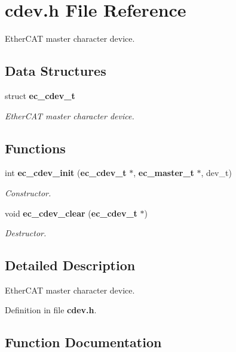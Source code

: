 \section{cdev.\-h File Reference}
\label{cdev_8h}


Ether\-C\-A\-T master character device.  


\subsection*{Data Structures}
\begin{DoxyCompactItemize}
\item 
struct {\bf ec\-\_\-cdev\-\_\-t}
\begin{DoxyCompactList}\small\item\em Ether\-C\-A\-T master character device. \end{DoxyCompactList}\end{DoxyCompactItemize}
\subsection*{Functions}
\begin{DoxyCompactItemize}
\item 
int {\bf ec\-\_\-cdev\-\_\-init} ({\bf ec\-\_\-cdev\-\_\-t} $\ast$, {\bf ec\-\_\-master\-\_\-t} $\ast$, dev\-\_\-t)
\begin{DoxyCompactList}\small\item\em Constructor. \end{DoxyCompactList}\item 
void {\bf ec\-\_\-cdev\-\_\-clear} ({\bf ec\-\_\-cdev\-\_\-t} $\ast$)\label{cdev_8h_a2f7ae759bd3e5d289477cc5d3f0194ff}

\begin{DoxyCompactList}\small\item\em Destructor. \end{DoxyCompactList}\end{DoxyCompactItemize}


\subsection{Detailed Description}
Ether\-C\-A\-T master character device. 

Definition in file {\bf cdev.\-h}.



\subsection{Function Documentation}

